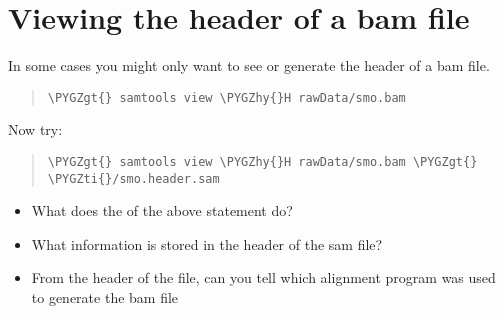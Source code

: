 \documentclass[a4paper,11pt,english]{sphinxmanual}
\def\PYGZgt{\char`\>}
\def\PYGZhy{\char`\-}
\def\PYGZti{\char`\~}
\begin{document}
\section{Viewing the header of a bam file}
\label{exercises/STEP3_viewManipulateAlignmentData_samtools:viewing-the-header-of-a-bam-file}
In some cases you might only want to see or generate the header of a bam file.
\begin{quote}

\begin{Verbatim}[frame=single, rulecolor=\color{lightgray}, fontfamily=courier, commandchars=\\\{\}]
\PYGZgt{} samtools view \PYGZhy{}H rawData/smo.bam
\end{Verbatim}
\end{quote}

Now try:
\begin{quote}

\begin{Verbatim}[frame=single, rulecolor=\color{lightgray}, fontfamily=courier, commandchars=\\\{\}]
\PYGZgt{} samtools view \PYGZhy{}H rawData/smo.bam \PYGZgt{} \PYGZti{}/smo.header.sam
\end{Verbatim}
\end{quote}
\begin{itemize}
\item {} 
What does the  of the above statement do?

\item {} 
What information is stored in the header of the sam file?

\item {} 
From the header of the file, can you tell which alignment program was used to generate the bam file

\end{itemize}
\end{document}
